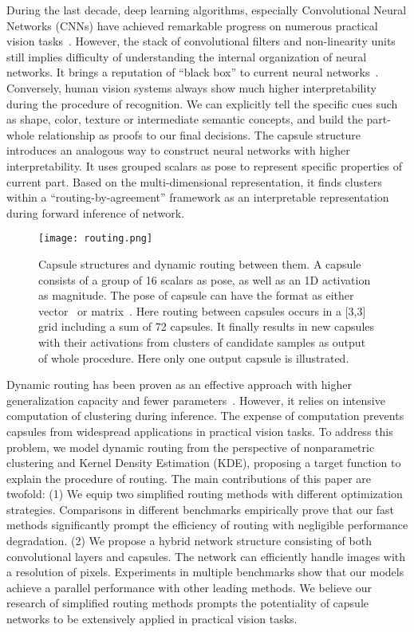 \documentclass[runningheads]{llncs}
\begin{document}
During the last decade, deep learning algorithms, especially Convolutional Neural Networks (CNNs) have achieved remarkable progress on numerous practical vision tasks~\cite{Krizhevsky2012ImageNet,karpathy2014large,lecun2015deep}. However, the stack of convolutional filters and non-linearity units still implies difficulty of understanding the internal organization of neural networks. It brings a reputation of ``black box'' to current neural networks~\cite{alain2016understanding}. Conversely, human vision systems always show much higher interpretability during the procedure of recognition. We can explicitly tell the specific cues such as shape, color, texture or intermediate semantic concepts, and build the part-whole relationship as proofs to our final decisions. The capsule structure introduces an analogous way to construct neural networks with higher interpretability. It uses grouped scalars as pose to represent specific properties of current part. Based on the multi-dimensional representation, it finds clusters within a ``routing-by-agreement'' framework as an interpretable representation during forward inference of network.
\begin{figure}
\centering
\texttt{[image: routing.png]}
\caption{Capsule structures and dynamic routing between them. A capsule consists of a group of 16 scalars as pose, as well as an 1D activation as magnitude. The pose of capsule can have the format as either vector~\cite{sabour2017dynamic} or matrix~\cite{hinton2018emrouting}. Here routing between capsules occurs in a [3,3] grid including a sum of 72 capsules. It finally results in new capsules with their activations from clusters of candidate samples as output of whole procedure. Here only one output capsule is illustrated.}
\label{fig:routing}
\end{figure}

Dynamic routing has been proven as an effective approach with higher generalization capacity and fewer parameters~\cite{hinton2018emrouting,zhaoweiemnlp2018}. However, it relies on intensive computation of clustering during inference. The expense of computation prevents capsules from widespread applications in practical vision tasks. To address this problem, we model dynamic routing from the perspective of nonparametric clustering and Kernel Density Estimation (KDE), proposing a target function to explain the procedure of routing. The main contributions of this paper are twofold: (1) We equip two simplified routing methods with different optimization strategies. Comparisons in different benchmarks empirically prove that our fast methods significantly prompt the efficiency of routing with negligible performance degradation. (2) We propose a hybrid network structure consisting of both convolutional layers and capsules. The network can efficiently handle images with a resolution of  pixels. Experiments in multiple benchmarks show that our models achieve a parallel performance with other leading methods. We believe our research of simplified routing methods prompts the potentiality of capsule networks to be extensively applied in practical vision tasks.
\end{document}

